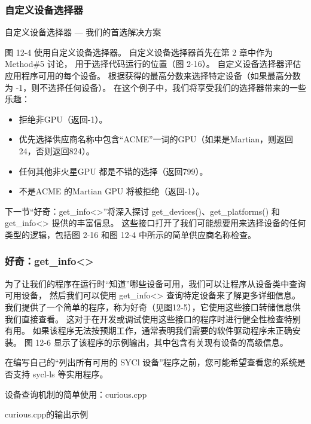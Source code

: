 \subsubsection{自定义设备选择器}
{\color{red} 自定义设备选择器 — 我们的首选解决方案}

图 12-4 使用自定义设备选择器。 自定义设备选择器首先在第 2 章中作为 Method\#5 讨论，
用于选择代码运行的位置（图 2-16）。 自定义设备选择器评估应用程序可用的每个设备。 
根据获得的最高分数来选择特定设备（如果最高分数为 -1，则不选择任何设备）。 
在这个例子中，我们将享受我们的选择器带来的一些乐趣：

\begin{itemize}
	\item 拒绝非GPU（返回-1）。

	\item 优先选择供应商名称中包含“ACME”一词的GPU（如果是Martian，则返回24，否则返回824）。

	\item 任何其他非火星GPU 都是不错的选择（返回799）。

	\item 不是ACME 的Martian GPU 将被拒绝（返回-1）。
\end{itemize}

下一节“好奇：get\_info<>”将深入探讨 get\_devices()、get\_platforms() 和 get\_info<> 提供的丰富信息。 
这些接口打开了我们可能想要用来选择设备的任何类型的逻辑，包括图 2-16 和图 12-4 中所示的简单供应商名称检查。

\subsubsection{好奇：get\_info<>}
为了让我们的程序在运行时“知道”哪些设备可用，我们可以让程序从设备类中查询可用设备，
然后我们可以使用 get\_info<> 查询特定设备来了解更多详细信息。 
我们提供了一个简单的程序，称为好奇（见图12-5），它使用这些接口转储信息供我们直接查看。 
这对于在开发或调试使用这些接口的程序时进行健全性检查特别有用。 
如果该程序无法按预期工作，通常表明我们需要的软件驱动程序未正确安装。 
图 12-6 显示了该程序的示例输出，其中包含有关现有设备的高级信息。

\begin{remark}
	在编写自己的“列出所有可用的 SYCl 设备”程序之前，您可能希望查看您的系统是否支持 sycl-ls 等实用程序。
\end{remark}

{\color{red} 设备查询机制的简单使用：curious.cpp}

{\color{red} curious.cpp的输出示例}

